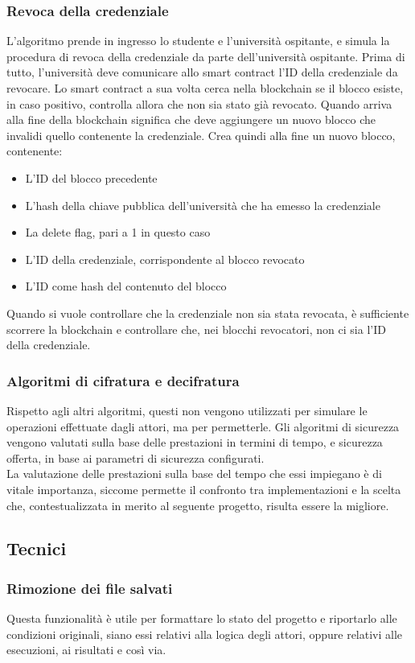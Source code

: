 \documentclass[a4paper,12pt]{article}
\begin{document}
\subsubsection{Revoca della credenziale}
L'algoritmo prende in ingresso lo studente e l'università ospitante, e simula la procedura di revoca della credenziale da parte dell'università ospitante. Prima di tutto, l'università deve comunicare allo smart contract l'ID della credenziale da revocare. Lo smart contract a sua volta cerca nella blockchain se il blocco esiste, in caso positivo, controlla allora che non sia stato già revocato. Quando arriva alla fine della blockchain significa che deve aggiungere un nuovo blocco che invalidi quello contenente la credenziale. Crea quindi alla fine un nuovo blocco, contenente:
\begin{itemize}
    \item L'ID del blocco precedente
    \item L'hash della chiave pubblica dell'università che ha emesso la credenziale
    \item La delete flag, pari a 1 in questo caso
    \item L'ID della credenziale, corrispondente al blocco revocato
    \item L'ID come hash del contenuto del blocco
\end{itemize}
Quando si vuole controllare che la credenziale non sia stata revocata, è sufficiente scorrere la blockchain e controllare che, nei blocchi revocatori, non ci sia l'ID della credenziale.
\subsubsection{Algoritmi di cifratura e decifratura}
Rispetto agli altri algoritmi, questi non vengono utilizzati per simulare le operazioni effettuate dagli attori, ma per permetterle. Gli algoritmi di sicurezza vengono valutati sulla base delle prestazioni in termini di tempo, e sicurezza offerta, in base ai parametri di sicurezza configurati.
\\[1em]
La valutazione delle prestazioni sulla base del tempo che essi impiegano è di vitale importanza, siccome permette il confronto tra implementazioni e la scelta che, contestualizzata in merito al seguente progetto, risulta essere la migliore.
\subsection{Tecnici}
\subsubsection{Rimozione dei file salvati}
Questa funzionalità è utile per formattare lo stato del progetto e riportarlo alle condizioni originali, siano essi relativi alla logica degli attori, oppure relativi alle esecuzioni, ai risultati e così via.
\end{document}
